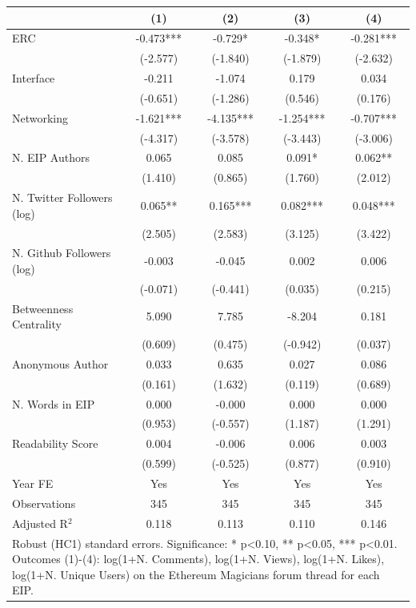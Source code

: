 \begin{tabular}{lcccc}
\toprule
 & (1) & (2) & (3) & (4) \\
\midrule
ERC & -0.473*** & -0.729* & -0.348* & -0.281*** \\
 & (-2.577) & (-1.840) & (-1.879) & (-2.632) \\
Interface & -0.211 & -1.074 & 0.179 & 0.034 \\
 & (-0.651) & (-1.286) & (0.546) & (0.176) \\
Networking & -1.621*** & -4.135*** & -1.254*** & -0.707*** \\
 & (-4.317) & (-3.578) & (-3.443) & (-3.006) \\
N. EIP Authors & 0.065 & 0.085 & 0.091* & 0.062** \\
 & (1.410) & (0.865) & (1.760) & (2.012) \\
N. Twitter Followers (log) & 0.065** & 0.165*** & 0.082*** & 0.048*** \\
 & (2.505) & (2.583) & (3.125) & (3.422) \\
N. Github Followers (log) & -0.003 & -0.045 & 0.002 & 0.006 \\
 & (-0.071) & (-0.441) & (0.035) & (0.215) \\
Betweenness Centrality & 5.090 & 7.785 & -8.204 & 0.181 \\
 & (0.609) & (0.475) & (-0.942) & (0.037) \\
Anonymous Author & 0.033 & 0.635 & 0.027 & 0.086 \\
 & (0.161) & (1.632) & (0.119) & (0.689) \\
N. Words in EIP & 0.000 & -0.000 & 0.000 & 0.000 \\
 & (0.953) & (-0.557) & (1.187) & (1.291) \\
Readability Score & 0.004 & -0.006 & 0.006 & 0.003 \\
 & (0.599) & (-0.525) & (0.877) & (0.910) \\
\midrule
Year FE & Yes & Yes & Yes & Yes \\
\midrule
Observations & 345 & 345 & 345 & 345 \\
Adjusted R$^2$ & 0.118 & 0.113 & 0.110 & 0.146 \\
\bottomrule
\multicolumn{5}{l}{\footnotesize Robust (HC1) standard errors. Significance: * p<0.10, ** p<0.05, *** p<0.01. Outcomes (1)-(4): log(1+N. Comments), log(1+N. Views), log(1+N. Likes), log(1+N. Unique Users) on the Ethereum Magicians forum thread for each EIP.} \\
\end{tabular}
